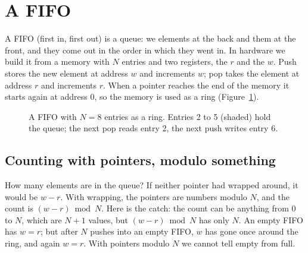 \section{A FIFO}
\label{sec:step07-fifo}

A FIFO (first in, first out) is a queue: we  elements at the back
and  them at the front, and they come out in the order in which they
went in. In hardware we build it from a memory with $N$ entries and two
registers, the  $r$ and the  $w$. Push
stores the new element at address $w$ and increments $w$; pop takes the
element at address $r$ and increments $r$. When a pointer reaches the end of
the memory it starts again at address 0, so the memory is used as a ring
(Figure~\ref{fig:step07-ring}).

\begin{figure}[ht]
\centering
{}
\caption{A FIFO with $N=8$ entries as a ring. Entries 2 to 5 (shaded) hold
the queue; the next pop reads entry 2, the next push writes entry 6.}
\label{fig:step07-ring}
\end{figure}

\subsection*{Counting with pointers, modulo something}

How many elements are in the queue? If neither pointer had wrapped around, it
would be $w - r$. With wrapping, the pointers are numbers modulo $N$, and the
count is $(w - r) \bmod N$. Here is the catch: the count can be anything from
0 to $N$, which are $N+1$ values, but $(w - r) \bmod N$ has only $N$. An
empty FIFO has $w = r$; but after $N$ pushes into an empty FIFO, $w$ has gone
once around the ring, and again $w = r$. With pointers modulo $N$ we cannot
tell empty from full.

